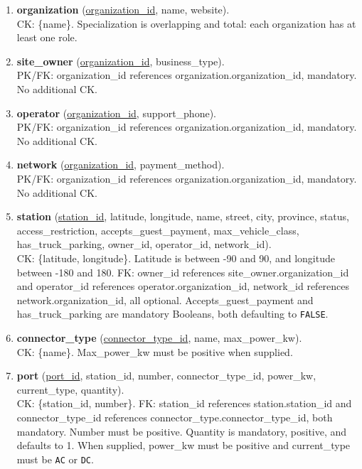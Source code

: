 \documentclass[sigconf,screen,nonacm]{acmart}
\begin{document}
\begin{enumerate}
\renewcommand{\labelenumi}{(\arabic{enumi})}
\setlength{\itemsep}{2pt}
\setlength{\parsep}{0pt}
\setlength{\parskip}{0pt}

\item \textbf{organization} (\underline{organization\_id}, name, website).\\
CK: \{name\}. Specialization is overlapping and total: each organization has at least one role.

\item \textbf{site\_owner} (\underline{organization\_id}, business\_type).\\
PK/FK: organization\_id references organization.organization\_id, mandatory. No additional CK.

\item \textbf{operator} (\underline{organization\_id}, support\_phone).\\
PK/FK: organization\_id references organization.organization\_id, mandatory. No additional CK.

\item \textbf{network} (\underline{organization\_id}, payment\_method).\\
PK/FK: organization\_id references organization.organization\_id, mandatory. No additional CK.

\item \textbf{station} (\underline{station\_id}, latitude, longitude, name, street, city, province, status, access\_restriction, accepts\_guest\_payment, max\_vehicle\_class, has\_truck\_parking, owner\_id, operator\_id, network\_id).\\
CK: \{latitude, longitude\}. Latitude is between -90 and 90, and longitude between -180 and 180. FK: owner\_id references site\_owner.organization\_id and operator\_id references operator.organization\_id, network\_id references network.organization\_id, all optional. Accepts\_guest\_payment and has\_truck\_parking are mandatory Booleans, both defaulting to \texttt{FALSE}.

\item \textbf{connector\_type} (\underline{connector\_type\_id}, name, max\_power\_kw).\\
CK: \{name\}. Max\_power\_kw must be positive when supplied.

\item \textbf{port} 
(\underline{port\_id}, station\_id, number, connector\_type\_id, power\_kw, current\_type, quantity).\\
CK: \{station\_id, number\}. FK: station\_id references station.station\_id and connector\_type\_id references connector\_type.connector\_type\_id, both mandatory. Number must be positive. Quantity is mandatory, positive, and defaults to 1. When supplied, power\_kw must be positive and current\_type must be \texttt{AC} or \texttt{DC}.


\end{enumerate}
\end{document}

